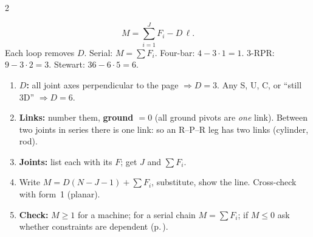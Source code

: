 \begin{multicols}{2}
\begin{deriv}[loop view: $M=\sum F_i-D\,\ell$ \added]
\[M=\sum_{i=1}^{J}F_i-D\,\ell.\]
Each loop removes $D$. Serial: $M=\sum F_i$. Four-bar: $4-3\cdot1=1$. 3-RPR: $9-3\cdot2=3$. Stewart: $36-6\cdot5=6$. \chk
\end{deriv}
\begin{recipe}
\label{w1:gk}
\begin{enumerate}
\item \textbf{$D$:} all joint axes perpendicular to the page $\Rightarrow D=3$. Any S, U, C, or ``still 3D'' $\Rightarrow D=6$.
\item \textbf{Links:} number them, \textbf{ground $=0$} (all ground pivots are \emph{one} link). Between two joints in series there is one link: so an R--P--R leg has two links (cylinder, rod).
\item \textbf{Joints:} list each with its $F$; get $J$ and $\sum F_i$.
\item Write $M=D(N-J-1)+\sum F_i$, substitute, show the line. Cross-check with form~1 (planar).
\item \textbf{Check:} $M\ge1$ for a machine; for a serial chain $M=\sum F_i$; if $M\le0$ ask whether constraints are dependent (p.\,\pageref{w1:odd}).
\end{enumerate}
\end{recipe}


\end{multicols}
